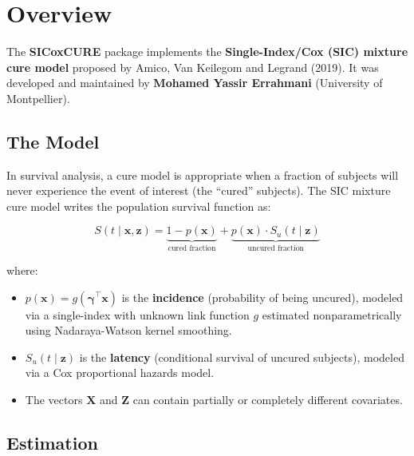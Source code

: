 \documentclass[12pt,a4paper]{article}
\begin{document}
\tableofcontents
\newpage

\section{Overview}

The \textbf{SICoxCURE} package implements the
\textbf{Single-Index/Cox (SIC) mixture cure model} proposed by
Amico, Van Keilegom and Legrand (2019). It was developed and
maintained by \textbf{Mohamed Yassir Errahmani}
(University of Montpellier).

\subsection{The Model}

In survival analysis, a cure model is appropriate when a fraction
of subjects will never experience the event of interest (the
``cured'' subjects). The SIC mixture cure model writes the
population survival function as:

\begin{formulebox}
  \[
    S(t \mid \mathbf{x}, \mathbf{z}) =
    \underbrace{1 - p(\mathbf{x})}_{\text{cured fraction}}
    +
    \underbrace{p(\mathbf{x}) \cdot S_u(t \mid \mathbf{z})}_{
      \text{uncured fraction}}
  \]
\end{formulebox}

\medskip

where:
\begin{itemize}[leftmargin=2cm]
  \item $p(\mathbf{x}) = g(\boldsymbol{\gamma}^\top \mathbf{x})$
    is the \textbf{incidence} (probability of being uncured),
    modeled via a single-index with unknown link function $g$
    estimated nonparametrically using Nadaraya-Watson kernel
    smoothing.
  \item $S_u(t \mid \mathbf{z})$ is the \textbf{latency}
    (conditional survival of uncured subjects), modeled via a
    Cox proportional hazards model.
  \item The vectors $\mathbf{X}$ and $\mathbf{Z}$ can contain
    partially or completely different covariates.
\end{itemize}

\subsection{Estimation}
\end{document}
